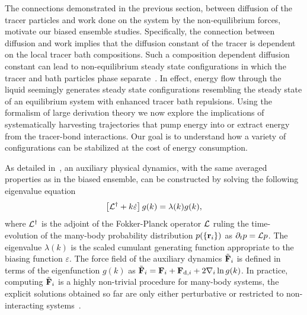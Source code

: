 \documentclass[pre, superscriptaddress, twocolumn,pre]{revtex4-1}
\begin{document}
The connections demonstrated in the previous section, between diffusion of the tracer particles and work done on the system by the non-equilibrium forces, motivate our biased ensemble studies. Specifically, the connection between diffusion and work implies that the diffusion constant of the tracer is dependent on the local tracer bath compositions. Such a composition dependent diffusion constant can lead to non-equilibrium steady state configurations in which the tracer and bath particles phase separate~\cite{delJunco2018}. In effect, energy flow through the liquid seemingly generates steady state configurations resembling the steady state of an equilibrium system with enhanced tracer bath repulsions. Using the formalism of large derivation theory we now explore the implications of systematically harvesting trajectories that pump energy into or extract energy from the tracer-bond interactions. Our goal is to understand how a variety of configurations can be stabilized at the cost of energy consumption. 




As detailed in~\cite{Chetrite2013}, an auxiliary physical dynamics, with the same averaged properties as in the biased ensemble, can be constructed by solving the following eigenvalue equation 
\begin{equation}\label{eq:adjointbiased}
	\left[{\cal L}^\dagger + k \dot\varepsilon\right] g(k) = \lambda(k) g(k) ,
\end{equation}
where ${\cal L}^\dagger$ is the adjoint of the Fokker-Planck operator $\cal L$ ruling the time-evolution of the many-body probability distribution $p(\{{\bf r}_i\})$ as $\partial_t p = {\cal L} p$. The eigenvalue $\lambda(k)$ is the scaled cumulant generating function appropriate to the biasing function $\varepsilon$. The force field of the auxiliary dynamics $\tilde{\bf F}_i$ is defined in terms of the eigenfunction $g(k)$ as $\tilde {\bf F}_i = {\bf F}_i+ {\bf F}_{{\rm d},i} + 2\nabla_i \ln g(k)$. In practice, computing $\tilde {\bf F}_i$ is a highly non-trivial procedure for many-body systems, the explicit solutions obtained so far are only either perturbative or restricted to non-interacting systems~\cite{Nemoto2018a, Chetrite2013, Touchette2016}.
\end{document}
